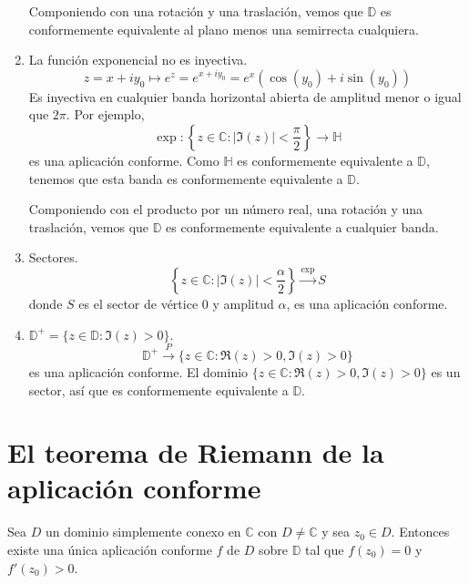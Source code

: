 \begin{example}
\begin{enumerate}
              Componiendo con una rotación y una traslación, vemos que $\mathbb{D}$ es conformemente equivalente al plano menos una semirrecta cualquiera.
        \item La función exponencial no es inyectiva.
              $$z = x + iy_0 \mapsto e^z = e^{x + iy_0} = e^x(\cos(y_0) + i\sin(y_0))$$
              Es inyectiva en cualquier banda horizontal abierta de amplitud menor o igual que $2\pi$.
              Por ejemplo,
              $$\exp: \left\{z \in \mathbb{C} : |\Im(z)| < \frac{\pi}{2}\right\} \to \mathbb{H}$$
              es una aplicación conforme.
              Como $\mathbb{H}$ es conformemente equivalente a $\mathbb{D}$, tenemos que esta banda es conformemente equivalente a $\mathbb{D}$.

              Componiendo con el producto por un número real, una rotación y una traslación, vemos que $\mathbb{D}$ es conformemente equivalente a cualquier banda.
        \item Sectores.
              $$\left\{z \in \mathbb{C} : |\Im(z)| < \frac{\alpha}{2}\right\} \xrightarrow{\exp} S$$
              donde $S$ es el sector de vértice 0 y amplitud $\alpha$, es una aplicación conforme.
        \item $\mathbb{D}^+ = \{z \in \mathbb{D} : \Im(z) > 0\}$.
              $$\mathbb{D}^+ \xrightarrow{P} \{z \in \mathbb{C} : \Re(z) > 0, \Im(z) > 0\}$$
              es una aplicación conforme. El dominio $\{z \in \mathbb{C} : \Re(z) > 0, \Im(z) > 0\}$ es un sector, así que es conformemente equivalente a $\mathbb{D}$.
    \end{enumerate}
\end{example}

\section{El teorema de Riemann de la aplicación conforme}
\begin{theorem}
    Sea $D$ un dominio simplemente conexo en $\mathbb{C}$ con $D \neq \mathbb{C}$ y sea $z_0 \in D$.
    Entonces existe una única aplicación conforme $f$ de $D$ sobre $\mathbb{D}$ tal que $f(z_0) = 0$ y $f'(z_0) > 0$.
\end{theorem}

